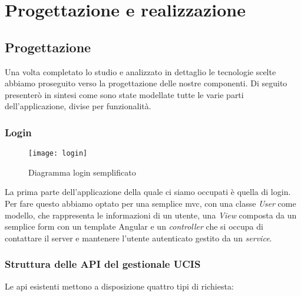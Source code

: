 
\chapter{Progettazione e realizzazione}
\label{cap:progettazione-realizzazione}



\section{Progettazione}
Una volta completato lo studio e analizzato in dettaglio le tecnologie scelte abbiamo proseguito verso la progettazione
delle nostre componenti. Di seguito presenterò in sintesi come sono state modellate tutte le varie parti
dell'applicazione, divise per funzionalità.
\subsection{Login}

\begin{wrapfigure}{l}{0.5\textwidth}
  \texttt{[image: login]} 
  \caption{Diagramma login semplificato}
  \label{fig:login}
\end{wrapfigure}

La prima parte dell'applicazione della quale ci siamo occupati è quella di login. Per fare questo abbiamo optato per una semplice \acrlong{mvc}, con
una classe \textit{User} come modello, che rappresenta le informazioni di un utente, una \textit{View} composta da un semplice form con un
template Angular e un \textit{controller} che si occupa di contattare il server e mantenere l'utente autenticato gestito da un
\textit{service}. \\
\subsection{Struttura delle API del gestionale UCIS}

Le \gls{api} esistenti mettono a disposizione quattro tipi di richiesta:

